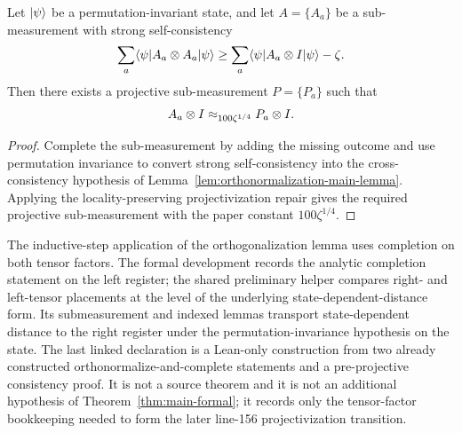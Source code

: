 \begin{theorem}\label{thm:orthonormalization}
	\leanok
	Let $\lvert \psi \rangle$ be a permutation-invariant state,
	and let $A = \{A_a\}$ be a sub-measurement with strong self-consistency
	\[
		\sum_a \langle \psi \rvert A_a \otimes A_a \lvert \psi \rangle
		\geq
		\sum_a \langle \psi \rvert A_a \otimes I \lvert \psi \rangle - \zeta.
	\]
	Then there exists a projective sub-measurement $P = \{P_a\}$ such that
	\[
		A_a \otimes I \approx_{100 \zeta^{1/4}} P_a \otimes I.
	\]
\end{theorem}
\begin{proof}
	\leanok
	Complete the sub-measurement by adding the missing outcome and use
	permutation invariance to convert strong self-consistency into the
	cross-consistency hypothesis of
	Lemma~\ref{lem:orthonormalization-main-lemma}.  Applying the
	locality-preserving projectivization repair gives the required projective
	sub-measurement with the paper constant \(100\zeta^{1/4}\).
\end{proof}

\begin{remark}\label{rem:lean-right-register-completion-helpers}
	The inductive-step application of the orthogonalization lemma uses
	completion on both tensor factors.  The formal development records the
	analytic completion statement on the left register; the shared preliminary
	helper compares right- and left-tensor placements at the level of the
	underlying state-dependent-distance form.  Its submeasurement and indexed
	lemmas transport state-dependent distance to the right register under the
	permutation-invariance hypothesis on the state.  The last linked declaration
	is a Lean-only construction from two already constructed
	orthonormalize-and-complete statements and a pre-projective consistency
	proof.  It is not a source theorem and it is not an additional hypothesis of
	Theorem~\ref{thm:main-formal}; it records only the tensor-factor bookkeeping
	needed to form the later line-156 projectivization transition.
\end{remark}

